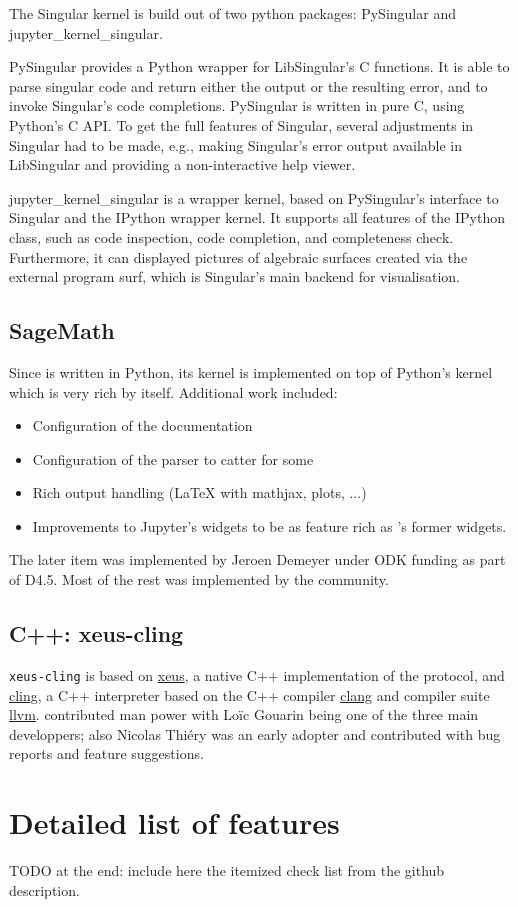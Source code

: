 \documentclass{deliverablereport}
\begin{document}
The Singular kernel is build out of two python packages: PySingular and jupyter_kernel_singular.

PySingular provides a Python wrapper for LibSingular's C functions. It is able to parse singular code and return either the
output or the resulting error, and to invoke Singular's code completions. PySingular is written in pure C, using Python's C API.
To get the full features of Singular, several adjustments in Singular had to be made, e.g., making Singular's error output available
in LibSingular and providing a non-interactive help viewer.

jupyter_kernel_singular is a wrapper kernel, based on PySingular's interface to Singular and the IPython wrapper kernel. It supports
all features of the IPython class, such as code inspection, code completion, and completeness check. Furthermore, it can displayed
pictures of algebraic surfaces created via the external program surf, which is Singular's main backend for visualisation.

\subsection{SageMath}

Since \Sage is written in Python, its kernel is implemented on top of Python's kernel which is very rich by itself.
Additional work included:
\begin{itemize}
\item Configuration of the documentation
\item Configuration of the parser to catter for some
\item Rich output handling (LaTeX with mathjax, plots, ...)
\item Improvements to Jupyter's widgets to be as feature rich as \Sage's former widgets.
\end{itemize}
The later item was implemented by Jeroen Demeyer under ODK funding as part of D4.5. Most of the rest was implemented by the \Sage community.

\subsection{C++: xeus-cling}

\texttt{xeus-cling} is based on \href{}{xeus}, a native C++ implementation of the \Jupyter protocol, and \href{cling}{cling},
a C++ interpreter based on the C++ compiler \href{}{clang} and compiler suite \href{}{llvm}.
\ODK contributed man power with Loïc Gouarin being one of the three main developpers; also Nicolas Thiéry was an early adopter and contributed with bug reports and feature suggestions.

\appendix

\section{Detailed list of features}

TODO at the end: include here the itemized check list from the github description.
\end{document}
